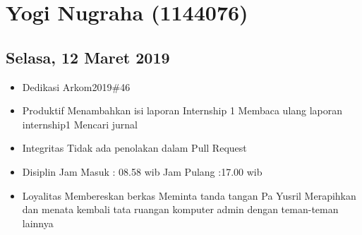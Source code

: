 \chapter{Yogi Nugraha (1144076)}

\section{Selasa, 12 Maret 2019}
\begin{itemize}
\item Dedikasi
\subitem Arkom2019\#46
\item Produktif
  \subitem Menambahkan isi laporan Internship 1
  \subitem Membaca ulang laporan internship1
  \subitem Mencari jurnal
\item Integritas
  \subitem Tidak ada penolakan dalam Pull Request
\item Disiplin
  \subitem Jam Masuk : 08.58 wib
  \subitem Jam Pulang :17.00 wib
\item Loyalitas
  \subitem Membereskan berkas  
  \subitem Meminta tanda tangan Pa Yusril
  \subitem Merapihkan dan menata kembali tata ruangan komputer admin dengan teman-teman lainnya
\end{itemize}


